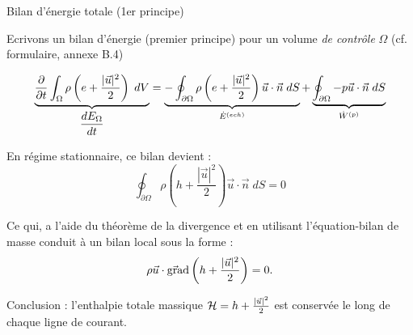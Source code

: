 \begin{frame}{Bilan d'énergie totale (1er principe)}
\small

Ecrivons un bilan d'énergie (premier principe) pour un volume {\em de contrôle} $\Omega$ (cf. formulaire, annexe B.4)

\begin{equation}
		\underbrace{\displaystyle \frac{\partial }{\partial t} \int_{\Omega} \rho \left( e + \frac{ |\vec{u}|^2}{2} \right) \; dV
		}_{\displaystyle \frac{d E_{\Omega}}{dt} }		 
		= \underbrace{  - \oint_{\partial \Omega}  \rho \left( e + \frac{ |\vec{u}|^2}{2} \right) \vec{u} \cdot \vec{n} \; dS
		}_{\dot{E}^{(ech)}}
		+ \underbrace{ \oint_{\partial \Omega} -p \vec{u} \cdot  \vec{n}   \; dS 
		}_{\dot{W}^{(p)}} 
		\label{eq:bilan_global_eulerien_e1}
\end{equation}

{}

\smallskip
\pause

En régime stationnaire, ce bilan devient :
\begin{equation}
 \oint_{\partial \Omega}  \rho \left( h + \frac{ |\vec{u}|^2}{2} \right) \vec{u} \cdot \vec{n} \; dS
=0		
\label{eq:bilan_global_eulerien_e2}
\end{equation}

\pause

Ce qui, a l'aide du théorème de la divergence et en utilisant l'équation-bilan de masse 
conduit à un bilan local sous la forme :
$$ 
\rho \vec{u} \cdot \vec{\mbox{\rm gra}}\mbox{\rm d} \left( h + \frac{|\vec{u}|^2}{2} \right) = 0. 
$$

\medskip
\pause

Conclusion : l'enthalpie totale massique ${\cal H} = h + \frac{|\vec{u}|^2}{2}$ est conservée le long de chaque ligne de courant.




\end{frame}


